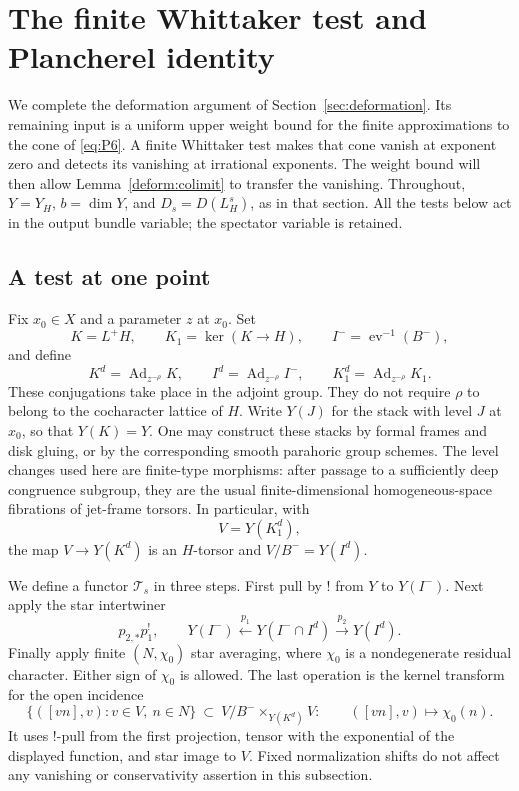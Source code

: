 \section{The finite Whittaker test and Plancherel identity}
\label{sec:plancherel}

We complete the deformation argument of Section~\ref{sec:deformation}.
Its remaining input is a uniform upper weight bound for the finite
approximations to the cone of \eqref{eq:P6}.  A finite Whittaker test makes
that cone vanish at exponent zero and detects its vanishing at irrational
exponents.  The weight bound will then allow Lemma~\ref{deform:colimit} to
transfer the vanishing.  Throughout, $Y=Y_H$, $b=\dim Y$, and
$D_s=D(L_H^s)$, as in that section.  All the tests below act in the output
bundle variable; the spectator variable is retained.

\subsection{A test at one point}
\label{planch:finite-test-construction}

Fix $x_0\in X$ and a parameter $z$ at $x_0$.  Set
\[
 K=L^+H,\qquad K_1=\ker(K\longrightarrow H),\qquad
 I^-=\operatorname{ev}^{-1}(B^-),
\]
and define
\[
 K^d=\operatorname{Ad}_{z^{-\rho}}K,\qquad
 I^d=\operatorname{Ad}_{z^{-\rho}}I^-,\qquad
 K^d_1=\operatorname{Ad}_{z^{-\rho}}K_1.
\]
These conjugations take place in the adjoint group.  They do not require
$\rho$ to belong to the cocharacter lattice of $H$.
Write $Y(J)$ for the stack with level $J$ at $x_0$, so that $Y(K)=Y$.
One may construct these stacks by formal frames and disk gluing, or by the
corresponding smooth parahoric group schemes.  The level changes used here
are finite-type morphisms: after passage to a sufficiently deep congruence
subgroup, they are the usual finite-dimensional homogeneous-space
fibrations of jet-frame torsors.  In particular, with
\[
 V=Y(K^d_1),
\]
the map $V\to Y(K^d)$ is an $H$-torsor and $V/B^-=Y(I^d)$.

We define a functor $\mathcal T_s$ in three steps.  First pull by $!$ from
$Y$ to $Y(I^-)$.  Next apply the star intertwiner
\[
 p_{2,*}p_1^!,\qquad
 Y(I^-)\xleftarrow{\ p_1\ }Y(I^-\cap I^d)
             \xrightarrow{\ p_2\ }Y(I^d).
\]
Finally apply finite $(N,\chi_0)$ star averaging, where $\chi_0$ is a
nondegenerate residual character.  Either sign of $\chi_0$ is allowed.
The last operation is the kernel transform for the open incidence
\begin{equation}
 \{([vn],v):v\in V,\ n\in N\}
 \ \subset\ V/B^-\mathbin{\times}_{Y(K^d)}V:
 \qquad ([vn],v)\longmapsto \chi_0(n).
 \label{eq:P7}
\end{equation}
It uses $!$-pull from the first projection, tensor with the exponential of
the displayed function, and star image to $V$.  Fixed normalization shifts
do not affect any vanishing or conservativity assertion in this
subsection.


